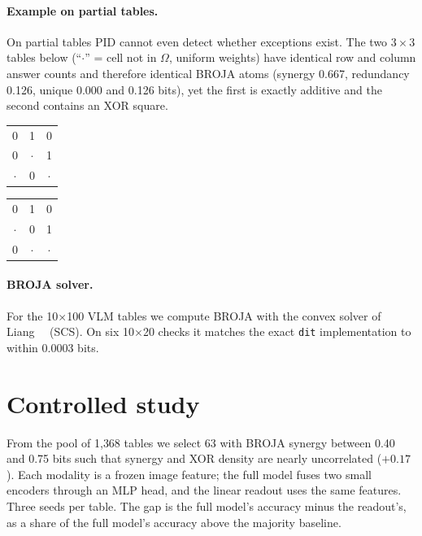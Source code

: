 \paragraph{Example on partial tables.}
On partial tables PID cannot even detect whether exceptions exist. The two $3\times3$ tables
below (``$\cdot$'' = cell not in $\Omega$, uniform weights) have identical row and column
answer counts and therefore identical BROJA atoms (synergy 0.667, redundancy 0.126, unique
0.000 and 0.126 bits), yet the first is exactly additive and the second contains an XOR square.
\begin{center}\small
\begin{tabular}{ccc}0&1&0\\0&$\cdot$&1\\$\cdot$&0&$\cdot$\end{tabular}
\qquad\qquad
\begin{tabular}{ccc}0&1&0\\$\cdot$&0&1\\0&$\cdot$&$\cdot$\end{tabular}
\end{center}

\paragraph{BROJA solver.}
For the 10$\times$100 VLM tables we compute BROJA with the convex solver of
Liang~\etal~\cite{liang2023quantifying} (SCS). On six 10$\times$20 checks it matches the exact
\texttt{dit} implementation to within 0.0003 bits.

\section{Controlled study}
\label{sup:controlled}

From the pool of 1{,}368 tables we select 63 with BROJA synergy between 0.40 and 0.75 bits
such that synergy and XOR density are nearly uncorrelated ($+0.17$). Each modality is a frozen
image feature; the full model fuses two small encoders through an MLP head, and the linear
readout uses the same features. Three seeds per table. The gap is the full model's accuracy
minus the readout's, as a share of the full model's accuracy above the majority baseline.

